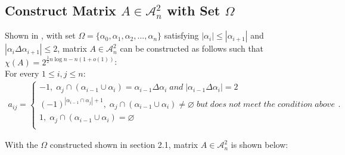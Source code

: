 \documentclass[11pt]{article}
\begin{document}
\subsection{Construct Matrix $A \in \mathcal{A}_n^2$ with Set $\Omega$}
Shown in \cite{ALON1997133}, with set $\Omega = \{\alpha_0, \alpha_1, \alpha_2, ..., \alpha_n\}$ satisfying $|\alpha_i| \leq |\alpha_{i+1}|$ and $|\alpha_i \Delta \alpha_{i+1}| \leq 2$, matrix $A \in \mathcal{A}_n^2$ can be constructed as follows such that $\chi(A)=2^{\frac{1}{2}n\log n-n(1+o(1))}$:\\
For every $1 \leq i,j \leq n$:
\begin{align*}
    a_{ij} = 
    \begin{cases}
    -1,\;\alpha_j\cap(\alpha_{i-1}\cup\alpha_i)=\alpha_{i-1}\Delta\alpha_{i}\;and\;|\alpha_{i-1}\Delta\alpha_{i}|=2 \\
    (-1)^{|\alpha_{i-1}\cap\alpha_j| + 1},\;\alpha_{j}\cap(\alpha_{i-1}\cup\alpha_{i})\neq\varnothing\;but\;does\;not\;meet\;the\;condition\;above \\
    1,\;\alpha_j\cap(\alpha_{i-1}\cup\alpha_i)=\varnothing \\
    \end{cases}.
\end{align*}

With the $\Omega$ constructed shown in section 2.1, matrix $A \in \mathcal{A}_n^2$ is shown below:
\end{document}
